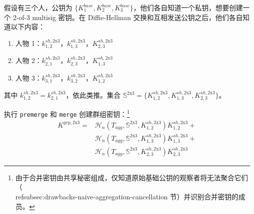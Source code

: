 假设有三个人，公钥为 $\{K^{base}_1,K^{base}_2,K^{base}_3\}$，他们各自知道一个私钥，想要创建一个 2-of-3 multisig 密钥。在 Diffie-Hellman 交换和互相发送公钥之后，他们各自知道以下内容：
\begin{enumerate}
    \item 人物 1：$k^{sh,\textrm{2x3}}_{1,2}$，$k^{sh,\textrm{2x3}}_{1,3}$，$K^{sh,\textrm{2x3}}_{2,3}$
    \item 人物 2：$k^{sh,\textrm{2x3}}_{2,1}$，$k^{sh,\textrm{2x3}}_{2,3}$，$K^{sh,\textrm{2x3}}_{1,3}$
    \item 人物 3：$k^{sh,\textrm{2x3}}_{3,1}$，$k^{sh,\textrm{2x3}}_{3,2}$，$K^{sh,\textrm{2x3}}_{1,2}$
\end{enumerate}

其中 $k^{sh,\textrm{2x3}}_{1,2} = k^{sh,\textrm{2x3}}_{2,1}$，依此类推。集合 $\mathbb{S}^{\textrm{2x3}} = \{ K^{sh,\textrm{2x3}}_{1,2}, K^{sh,\textrm{2x3}}_{1,3}, K^{sh,\textrm{2x3}}_{2,3}\}$。

执行 {\tt premerge} 和 {\tt merge} 创建群组密钥：\footnote{由于合并密钥由共享秘密组成，仅知道原始基础公钥的观察者将无法聚合它们（\\ref{subsec:drawbacks-naive-aggregation-cancellation} 节）并识别合并密钥的成员。}\vspace{.175cm}
\begin{align*}
    K^{grp,\textrm{2x3}} = &\mathcal{H}_n(T_{agg},\mathbb{S}^{\textrm{2x3}},K^{sh,\textrm{2x3}}_{1,2}) K^{sh,\textrm{2x3}}_{1,2} + \\
                           &\mathcal{H}_n(T_{agg},\mathbb{S}^{\textrm{2x3}},K^{sh,\textrm{2x3}}_{1,3}) K^{sh,\textrm{2x3}}_{1,3} + \\
                           &\mathcal{H}_n(T_{agg},\mathbb{S}^{\textrm{2x3}},K^{sh,\textrm{2x3}}_{2,3}) K^{sh,\textrm{2x3}}_{2,3}
\end{align*}

